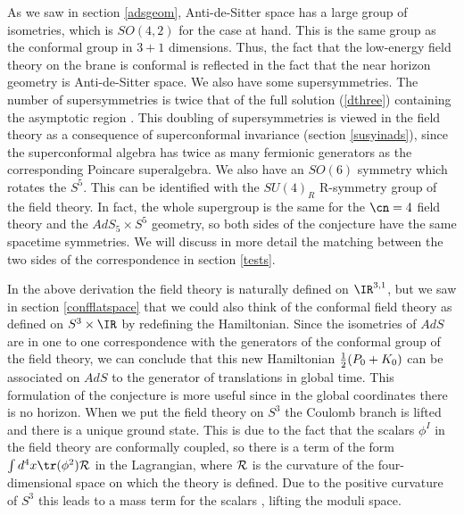 As we saw in section \ref{adsgeom}, Anti-de-Sitter space has a large group
of isometries, which is $SO(4,2)$ for the case at hand.  This is the
same group as the conformal group in $3+1$ dimensions.  Thus, the fact
that the low-energy field theory on the brane is conformal is
reflected in the fact that the near horizon geometry is Anti-de-Sitter
space.  We also have some supersymmetries.
The number of supersymmetries is twice that of the full solution 
(\ref{dthree})
containing the asymptotic region \cite{Gibbons:1993sv}.  This doubling
of supersymmetries is viewed in the field theory as a consequence of
superconformal invariance (section \ref{susyinads}),
 since the superconformal
algebra has twice as many fermionic generators as the corresponding
Poincare superalgebra. 
We also have an $SO(6)$
symmetry which rotates the $S^5$. This can be identified with the
$SU(4)_R$ R-symmetry group of the field theory. In fact, the whole
supergroup is the same for the $\cn=4$ field theory and the $AdS_5
\times S^5 $ geometry, so both sides of the conjecture
have the same spacetime symmetries. We will discuss in more detail the
matching between the two sides of the correspondence in section
\ref{tests}.

In the above derivation the field theory is naturally defined on
$\IR^{3,1}$, but we saw in section \ref{confflatspace} that we could also
think of the conformal field theory as defined on $S^3 \times \IR$ by
redefining the Hamiltonian. Since the isometries of $AdS$ are in one
to one correspondence with the generators of the conformal group of the
field theory, we can conclude that this new Hamiltonian 
${1\over 2}(P_0+K_0)$ can be
associated on $AdS$ to the generator of translations in global time.
This formulation of the conjecture is more useful since in the global
coordinates there is no horizon.  When we put the field theory on
$S^3$ the Coulomb branch is lifted and there is a unique ground
state. This is due to the fact that the scalars $\phi^I$ in the field
theory are conformally coupled, so there is a term of the form $\int
d^4 x \tr(\phi^2) {\cal R}$ in the Lagrangian, where $\cal R$ is the
curvature of the four-dimensional space on which the theory is
defined. Due to the positive curvature of $S^3$ this leads to a mass
term for the scalars \cite{Witten:1998qj}, lifting the moduli space.

